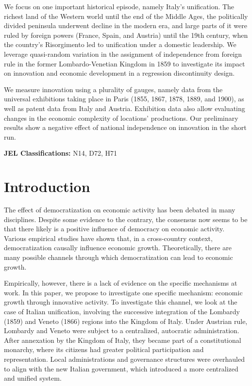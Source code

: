 \noindent We focus on one important historical episode, namely Italy’s unification. The richest land of the Western world until the end of the Middle Ages, the politically divided peninsula underwent decline in the modern era, and large parts of it were ruled by foreign powers (France, Spain, and Austria) until the 19th century, when the country’s Risorgimento led to unification under a domestic leadership. We leverage quasi-random variation in the assignment of independence from foreign rule in the former Lombardo-Venetian Kingdom in 1859 to investigate its impact on innovation and economic development in a regression discontinuity design.

\noindent We measure innovation using a plurality of gauges, namely data from the universal exhibitions taking place in Paris (1855, 1867, 1878, 1889, and 1900), as well as patent data from Italy and Austria. Exhibition data also allow evaluating changes in the economic complexity of locations’ productions. Our preliminary results show a negative effect of national independence on innovation in the short run.



\textbf{JEL Classifications:} N14, D72, H71

\clearpage

\section{Introduction}

The effect of democratization on economic activity has been debated in many disciplines. Despite some evidence to the contrary, the consensus now seems to be that there likely is a positive influence of democracy on economic activity. Various empirical studies have shown that, in a cross-country context, democratization causally influence economic growth. Theoretically, there are many possible channels through which democratization can lead to economic growth. %

Empirically, however, there is a lack of evidence on the specific mechanisms at work. In this paper, we propose to investigate one specific mechanism: economic growth through innovative activity. To investigate this channel, we look at the case of Italian unification, involving the successive integration of the Lombardy (1859) and Veneto (1866) regions into the Kingdom of Italy. Under Austrian rule, Lombardy and Veneto were subject to a centralized, autocratic administration. After annexation by the Kingdom of Italy, they became part of a constitutional monarchy, where its citizens had greater political participation and representation. Local administrations and governance structures were overhauled to align with the new Italian government, which introduced a more centralized and unified system.

